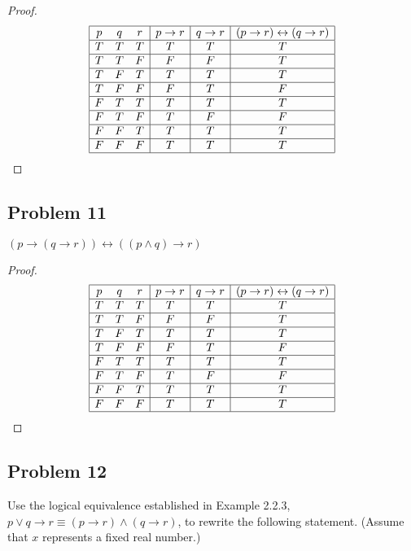 \documentclass[14pt]{extarticle}
\newcommand{\bic}{\leftrightarrow}
\begin{document}
\begin{proof}
$$
\begin{array}{|ccc|c|c|c|}
\hline
p & q & r & p \to r & q \to r & (p \to r) \bic (q \to r) \\
\hline
T & T & T & T & T & T \\
\hline
T & T & F & F & F & T \\
\hline
T & F & T & T & T & T \\
\hline
T & F & F & F & T & F \\
\hline
F & T & T & T & T & T \\
\hline
F & T & F & T & F & F \\
\hline
F & F & T & T & T & T \\
\hline
F & F & F & T & T & T \\
\hline
\end{array}
$$
\end{proof}

\subsection{Problem 11}
$(p \to (q \to r)) \bic ((p \wedge q) \to r)$

\begin{proof}
$$
\begin{array}{|ccc|c|c|c|}
\hline
p & q & r & p \to r & q \to r & (p \to r) \bic (q \to r) \\
\hline
T & T & T & T & T & T \\
\hline
T & T & F & F & F & T \\
\hline
T & F & T & T & T & T \\
\hline
T & F & F & F & T & F \\
\hline
F & T & T & T & T & T \\
\hline
F & T & F & T & F & F \\
\hline
F & F & T & T & T & T \\
\hline
F & F & F & T & T & T \\
\hline
\end{array}
$$
\end{proof}

\subsection{Problem 12}
Use the logical equivalence established in Example 2.2.3, $p \vee q \to r \equiv (p \to r) \wedge (q \to r)$, to rewrite the following statement. (Assume that $x$ represents a fixed real number.)
\end{document}
